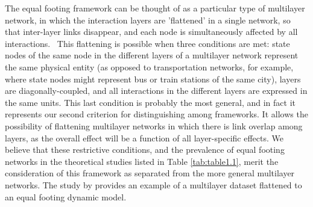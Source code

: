 The equal footing framework can be thought of as a particular type of multilayer network, in which the interaction layers are {}'flattened{}' in a single network, so that inter-layer links disappear, and each node is simultaneously affected by all interactions. \ This flattening is possible when three conditions are met: state nodes of the same node in the different layers of a multilayer network represent the same physical entity (as opposed to transportation networks, for example, where state nodes might represent bus or train stations of the same city), layers are diagonally-coupled, and all interactions in the different layers are expressed in the same units. This last condition is probably the most general, and in fact it represents our second criterion for distinguishing among frameworks. It allows the possibility of flattening multilayer networks in which there is link overlap among layers, as the overall effect will be a function of all layer-specific effects. We believe that these restrictive conditions, and the prevalence of equal footing networks in the theoretical studies listed in Table \ref{tab:table1.1}, merit the consideration of this framework as separated from the more general multilayer networks. The study by \cite{Melian2009} provides an example of a multilayer dataset flattened to an equal footing dynamic model.

\clearpage

